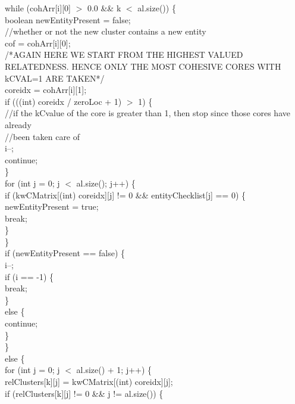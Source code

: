 \begin{ttfamily   }
\begin{scriptsize}
        \noindent while (cohArr[i][0] $>$ 0.0 \&\& k $<$ al.size()) \{\\
            boolean newEntityPresent = false;\\\noindent//whether or not the new cluster contains a new entity\\
            cof = cohArr[i][0];\\\noindent/*AGAIN HERE WE START FROM THE HIGHEST VALUED RELATEDNESS. HENCE  ONLY THE MOST COHESIVE CORES WITH kCVAL=1 ARE TAKEN*/\\
            coreidx = cohArr[i][1];\\
            if (((int) coreidx / zeroLoc + 1) $>$ 1) \{\\\noindent//if the kCvalue of the core is greater than 1, then stop since those cores have already\\
                \noindent//been taken care of\\
                i--;\\
                continue;\\
            \}\\
            \noindent for (int j = 0;   j $<$ al.size();   j++) \{\\
                if (kwCMatrix[(int) coreidx][j] != 0 \&\& entityChecklist[j] == 0) \{\\
                    newEntityPresent = true;\\
                    break;\\
                \}\\
            \}\\
            if (newEntityPresent == false) \{\\
                i--;\\
                if (i == -1) \{\\
                    break;\\
                \}\\ else \{\\
                    continue;\\
                \}\\
            \}\\ else \{\\
                \noindent for (int j = 0;   j $<$ al.size() + 1;   j++) \{\\
                    relClusters[k][j] = kwCMatrix[(int) coreidx][j];\\
                    if (relClusters[k][j] != 0 \&\& j != al.size()) \{\\

\end{scriptsize}
\end{ttfamily   }

